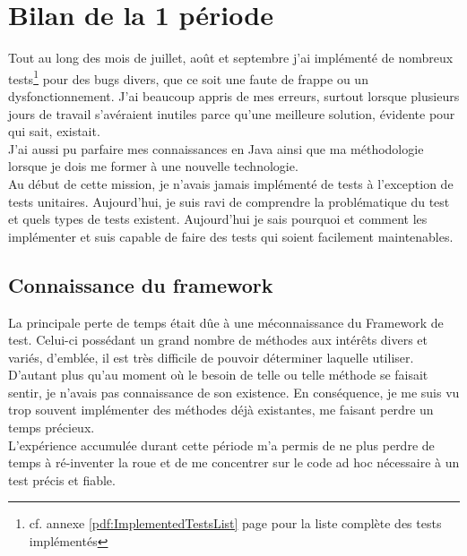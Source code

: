 \clearpage
\section{Bilan de la 1 p\'{e}riode}
Tout au long des mois de juillet, ao\^{u}t et septembre j'ai impl\'{e}ment\'{e} de nombreux tests\footnote{cf. annexe \ref{pdf:ImplementedTestsList} page \pageref{pdf:ImplementedTestsList} pour la liste compl\`{e}te des tests impl\'{e}ment\'{e}s} pour des bugs divers, que ce soit une faute de frappe ou un dysfonctionnement. J'ai beaucoup appris de mes erreurs, surtout lorsque plusieurs jours de travail s'av\'{e}raient inutiles parce qu'une meilleure solution, \'{e}vidente pour qui sait, existait.\\
J'ai aussi pu parfaire mes connaissances en Java ainsi que ma m\'{e}thodologie lorsque je dois me former \`{a} une nouvelle technologie.\\
Au d\'{e}but de cette mission, je n'avais jamais impl\'{e}ment\'{e} de tests \`{a} l'exception de tests unitaires. Aujourd'hui, je suis ravi de comprendre la probl\'{e}matique du test et quels types de tests existent. Aujourd'hui je sais pourquoi et comment les impl\'{e}menter et suis capable de faire des tests qui soient facilement maintenables.




\subsection{Connaissance du framework}
La principale perte de temps \'{e}tait d\^{u}e \`{a} une m\'{e}connaissance du Framework de test. Celui-ci poss\'{e}dant un grand nombre de m\'{e}thodes aux int\'{e}r\^{e}ts divers et vari\'{e}s, d'embl\'{e}e, il est tr\`{e}s difficile de pouvoir d\'{e}terminer laquelle utiliser. D'autant plus qu'au moment o\`{u} le besoin de telle ou telle m\'{e}thode se faisait sentir, je n'avais pas connaissance de son existence. En cons\'{e}quence, je me suis vu trop souvent impl\'{e}menter des m\'{e}thodes d\'{e}j\`{a} existantes, me faisant perdre un temps pr\'{e}cieux.\\
L'exp\'{e}rience accumul\'{e}e durant cette p\'{e}riode m'a permis de ne plus perdre de temps \`{a} r\'{e}-inventer la roue et de me concentrer sur le code ad hoc n\'{e}cessaire \`{a} un test pr\'{e}cis et fiable.

